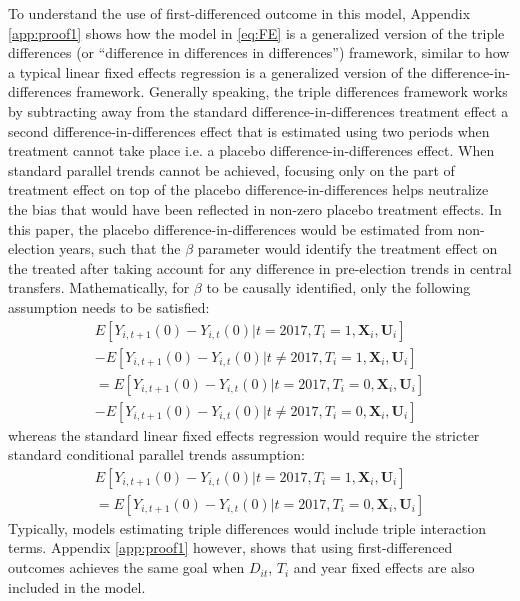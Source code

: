 \documentclass[12pt]{article}\usepackage[]{graphicx}\usepackage[]{color}
\newcommand{\1}{\mathbbm{1}}
\begin{document}
To understand the use of first-differenced outcome in this model, Appendix \ref{app:proof1} shows how the model in \ref{eq:FE} is a generalized version of the triple differences (or ``difference in differences in differences'') framework, similar to how a typical linear fixed effects regression is a generalized version of the difference-in-differences framework. Generally speaking, the triple differences framework works by subtracting away from the standard difference-in-differences treatment effect a second difference-in-differences effect that is estimated using two periods when treatment cannot take place i.e. a placebo difference-in-differences effect. When standard parallel trends cannot be achieved, focusing only on the part of treatment effect on top of the placebo difference-in-differences helps neutralize the bias that would have been reflected in non-zero placebo treatment effects. In this paper, the placebo difference-in-differences would be estimated from non-election years, such that the $\beta$ parameter would identify the treatment effect on the treated after taking account for any difference in pre-election trends in central transfers. Mathematically, for $\beta$ to be causally identified, only the following assumption needs to be satisfied:
\begin{align*}
E[Y_{i,t+1}(0) - Y_{i,t}(0) | t = 2017, T_i = 1, \mathbf{X}_i, \mathbf{U}_i] \\  - E[Y_{i,t+1}(0) - Y_{i,t}(0) | t \neq 2017, T_i = 1, \mathbf{X}_i, \mathbf{U}_i] \\
= E[Y_{i,t+1}(0) - Y_{i,t}(0) | t = 2017, T_i = 0, \mathbf{X}_i, \mathbf{U}_i] \\  - E[Y_{i,t+1}(0) - Y_{i,t}(0) |  t \neq 2017, T_i = 0, \mathbf{X}_i, \mathbf{U}_i]
\end{align*} 
whereas the standard linear fixed effects regression would require the stricter standard conditional parallel trends assumption:
\begin{align*}
E[Y_{i,t+1}(0) - Y_{i,t}(0) | t = 2017, T_i = 1, \mathbf{X}_i, \mathbf{U}_i] \\
= E[Y_{i,t+1}(0) - Y_{i,t}(0) |  t = 2017, T_i = 0, \mathbf{X}_i, \mathbf{U}_i]
\end{align*} 
Typically, models estimating triple differences would include triple interaction terms. Appendix \ref{app:proof1} however, shows that using first-differenced outcomes achieves the same goal when $D_{it}$, $T_i$ and year fixed effects are also included in the model.
\end{document}
